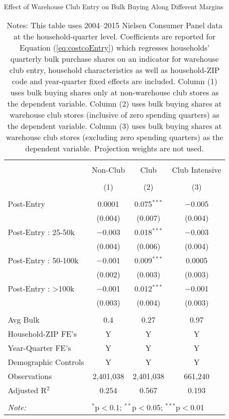 \begin{table}[!htbp] \centering
  \caption{Effect of Warehouse Club Entry on Bulk Buying Along Different Margins}
  \label{tab:costcoEntryDDMargin}
\begin{tabular}{@{\extracolsep{5pt}}lccc}
\\[-1.8ex]\hline
\hline \\[-1.8ex]
 & Non-Club & Club & Club Intensive \\
\\[-1.8ex] & (1) & (2) & (3)\\
\hline \\[-1.8ex]
 Post-Entry & 0.0001 & 0.075$^{***}$ & $-$0.005 \\
  & (0.004) & (0.007) & (0.004) \\
  Post-Entry : 25-50k & $-$0.003 & 0.018$^{***}$ & $-$0.003 \\
  & (0.004) & (0.006) & (0.004) \\
  Post-Entry : 50-100k & $-$0.001 & 0.009$^{***}$ & 0.0005 \\
  & (0.002) & (0.003) & (0.003) \\
  Post-Entry : >100k & $-$0.001 & 0.012$^{***}$ & $-$0.001 \\
  & (0.003) & (0.004) & (0.003) \\
 \hline \\[-1.8ex]
Avg Bulk & 0.4 & 0.27 & 0.97 \\
Household-ZIP FE's & Y & Y & Y \\
Year-Quarter FE's & Y & Y & Y \\
Demographic Controls & Y & Y & Y \\
Observations & 2,401,038 & 2,401,038 & 661,240 \\
Adjusted R$^{2}$ & 0.254 & 0.567 & 0.193 \\
\hline
\hline \\[-1.8ex]
\textit{Note:}  & \multicolumn{3}{l}{$^{*}$p$<$0.1; $^{**}$p$<$0.05; $^{***}$p$<$0.01} \\
\end{tabular}
\caption*{Notes: This table uses 2004--2015 Nielsen Consumer Panel data at the household-quarter level. Coefficients are reported for Equation (\ref{eq:costcoEntry}) which regresses households' quarterly bulk purchase shares on an indicator for warehouse club entry, household characteristics as well as household-ZIP code and year-quarter fixed effects are included. Column (1) uses bulk buying shares only at non-warehouse club stores as the dependent variable. Column (2) uses bulk buying shares at warehouse club stores (inclusive of zero spending quarters) as the dependent variable. Column (3) uses bulk buying shares at warehouse club stores (excluding zero spending quarters) as the dependent variable. Projection weights are not used.}
\end{table}
